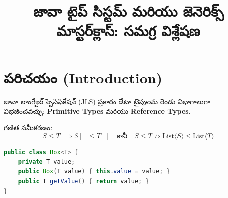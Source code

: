 \documentclass[10pt,journal,compsoc,onecolumn]{IEEEtran}
\begin{document}
\title{జావా టైప్ సిస్టమ్ మరియు జెనెరిక్స్ మాస్టర్‌క్లాస్: సమగ్ర విశ్లేషణ}
\maketitle

\section{పరిచయం (Introduction)}
జావా లాంగ్వేజ్ స్పెసిఫికేషన్ (JLS) ప్రకారం డేటా టైపులను రెండు విభాగాలుగా విభజించవచ్చు: 
\textbf{Primitive Types} మరియు \textbf{Reference Types}.

గణిత సమీకరణం:
\begin{equation}
S \le T \implies S[] \le T[] \quad \text{కానీ} \quad S \le T \nRightarrow \text{List}\langle S \rangle \le \text{List}\langle T \rangle
\end{equation}

\begin{lstlisting}[language=Java]
public class Box<T> {
    private T value;
    public Box(T value) { this.value = value; }
    public T getValue() { return value; }
}
\end{lstlisting}
\end{document}

